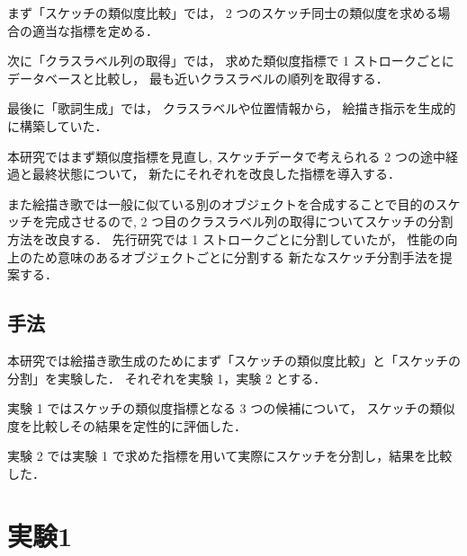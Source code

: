 \documentclass[twocolumn]{jarticle}     %
\begin{document}
まず「スケッチの類似度比較」では，
2 つのスケッチ同士の類似度を求める場合の適当な指標を定める．

次に「クラスラベル列の取得」では，
求めた類似度指標で 1 ストロークごとにデータベースと比較し，
最も近いクラスラベルの順列を取得する．

最後に「歌詞生成」では，
クラスラベルや位置情報から，
絵描き指示を生成的に構築していた．

本研究ではまず類似度指標を見直し,
スケッチデータで考えられる 2 つの途中経過と最終状態について，
新たにそれぞれを改良した指標を導入する．

また絵描き歌では一般に似ている別のオブジェクトを合成することで目的のスケッチを完成させるので,
2 つ目のクラスラベル列の取得についてスケッチの分割方法を改良する．
先行研究では 1 ストロークごとに分割していたが，
性能の向上のため意味のあるオブジェクトごとに分割する
新たなスケッチ分割手法を提案する．


\subsection{手法}
本研究では絵描き歌生成のためにまず「スケッチの類似度比較」と「スケッチの分割」を実験した．
それぞれを実験 1，実験 2 とする．

実験 1 ではスケッチの類似度指標となる 3 つの候補について，
スケッチの類似度を比較しその結果を定性的に評価した．

実験 2 では実験 1 で求めた指標を用いて実際にスケッチを分割し，結果を比較した．


\section{実験1}
\end{document}
